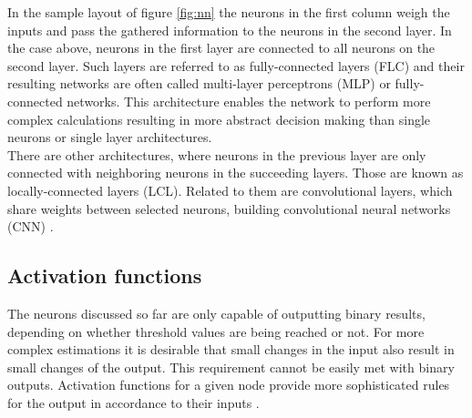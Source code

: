 In the sample layout of figure \ref{fig:nn} the neurons in the first column weigh the
inputs and pass the gathered information to the neurons in the second layer. In the case
above, neurons in the first layer are connected to all neurons on the second layer. Such
layers are referred to as fully-connected layers (FLC) and their resulting networks are
often called multi-layer perceptrons (MLP) or fully-connected networks. This architecture
enables the network to perform more complex calculations resulting in more abstract
decision making than single neurons or single layer architectures.\\
There are other architectures, where neurons in the previous layer are only connected with
neighboring neurons in the succeeding layers. Those are known as locally-connected layers
(LCL). Related to them are convolutional layers, which share weights between selected
neurons, building convolutional neural networks (CNN) \cite{lecun1999object}.

\subsection{Activation functions}

The neurons discussed so far are only capable of outputting binary results, depending on
whether threshold values are being reached or not. For more complex estimations it is
desirable that small changes in the input also result in small changes of the output. This
requirement cannot be easily met with binary outputs. Activation functions for a given
node provide more sophisticated rules for the output in accordance to their inputs
\cite{vzilinskas2006practical}.

